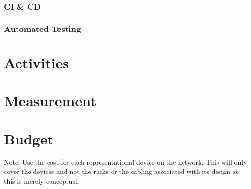 \documentclass[12pt, letterpaper]{article}
\begin{document}
		\subsubsection{CI \& CD}
		\subsubsection{Automated Testing}
		

\newpage

\section{Activities}

\newpage

\section{Measurement}

\newpage

\section{Budget}
Note: Use the cost for each representational device on the network.
This will only cover the devices and not the racks or the cabling associated with its design as this is merely conceptual.
\end{document}
